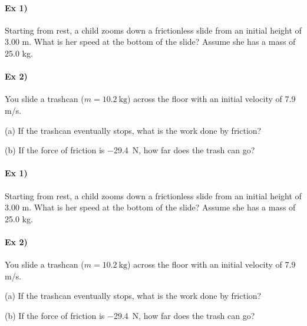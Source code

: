 \documentclass[10pt,landscape]{article}
\begin{document}
\pagestyle{empty}

\begin{multicols*}{2}

  \paragraph{Ex 1)}
  Starting from rest, a child zooms down a frictionless slide from an initial height of 3.00 m.  What is her speed at the bottom of the slide?  Assume she has a mass of 25.0 kg.

  \vfill

  \paragraph{Ex 2)}
  You slide a trashcan ($m = \SI{10.2}{\kilo\gram}$) across the floor with an initial velocity of 7.9 m/s.
  
  \vspace{1em}
  
      (a) If the trashcan eventually stops, what is the work done by friction?
      
      (b) If the force of friction is \SI{-29.4}{\newton}, how far does the trash can go?

      \vfill\hfill

  \columnbreak

  \paragraph{Ex 1)}
  Starting from rest, a child zooms down a frictionless slide from an initial height of 3.00 m.  What is her speed at the bottom of the slide?  Assume she has a mass of 25.0 kg.

  \vfill

  \paragraph{Ex 2)}
  You slide a trashcan ($m = \SI{10.2}{\kilo\gram}$) across the floor with an initial velocity of 7.9 m/s.
  
  \vspace{1em}
  
      (a) If the trashcan eventually stops, what is the work done by friction?
      
      (b) If the force of friction is \SI{-29.4}{\newton}, how far does the trash can go?

     \vfill\hfill
  
\end{multicols*}
\end{document}
